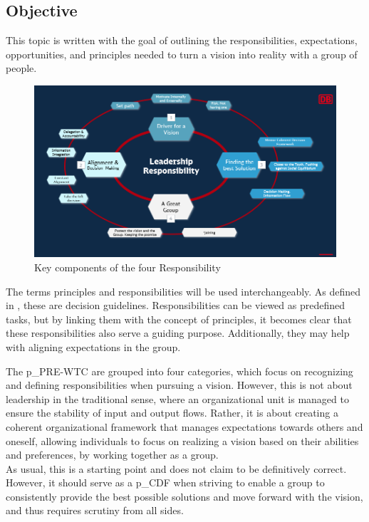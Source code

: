 \subsection{Objective}

This topic is written with the goal of outlining the responsibilities, expectations, opportunities, and principles needed to turn a vision into reality with a group of people.

\begin{figure}[H]
	\centering
	\includegraphics[scale = 0.5]{attachment/chapter_OWN/Rubric_LR_Overview}
	\caption{Key components of the four Responsibility}
\end{figure}

The terms principles and responsibilities will be used interchangeably. As defined in , these are decision guidelines. Responsibilities can be viewed as predefined tasks, but by linking them with the concept of principles, it becomes clear that these responsibilities also serve a guiding purpose. Additionally, they may help with aligning expectations in the group.

The \gls{p_PRE-WTC} are grouped into four categories, which focus on recognizing and defining responsibilities when pursuing a vision. However, this is not about leadership in the traditional sense, where an organizational unit is managed to ensure the stability of input and output flows. Rather, it is about creating a coherent organizational framework that manages expectations towards others and oneself, allowing individuals to focus on realizing a vision based on their abilities and preferences, by working together as a group.\\

As usual, this is a starting point and does not claim to be definitively correct. However, it should serve as a \gls{p_CDF} when striving to enable a group to consistently provide the best possible solutions and move forward with the vision, and thus requires scrutiny from all sides.


